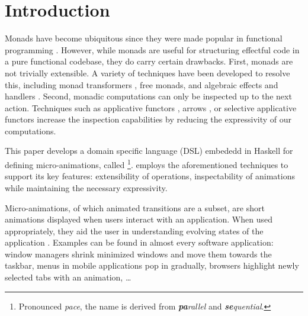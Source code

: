 \section{Introduction}
\label{sec:intro}

Monads have become ubiquitous since they were made popular in functional programming \cite{DBLP:conf/lfp/Wadler90}. However, while monads are useful for structuring effectful code in a pure functional codebase, they do carry certain drawbacks. First, monads are not trivially extensible. A variety of techniques have been developed to resolve this, including monad transformers \cite{DBLP:conf/popl/LiangHJ95}, free monads, and algebraic effects and handlers \cite{DBLP:conf/esop/PlotkinP09}. Second, monadic computations can only be inspected up to the next action. Techniques such as applicative functors \cite{DBLP:journals/jfp/McbrideP08}, arrows \cite{DBLP:journals/scp/Hughes00}, or selective applicative functors increase the inspection capabilities by reducing the expressivity of our computations.

This paper develops a domain specific language (DSL) embededd in Haskell for defining micro-animations, called \dsl{}\footnote{Pronounced \textit{pace}, the name is derived from \textit{\textbf{pa}rallel} and \textit{\textbf{se}quential}.}. \dsl{} employs the aforementioned techniques to support its key features: extensibility of operations, inspectability of animations while maintaining the necessary expressivity.

Micro-animations, of which animated transitions are a subset, are short animations displayed when users interact with an application. When used appropriately, they aid the user in understanding evolving states of the application \cite{DBLP:conf/infovis/BedersonB99} \cite{DBLP:conf/chi/Gonzalez96} \cite{DBLP:journals/tvcg/HeerR07}. Examples can be found in almost every software application: window managers shrink minimized windows and move them towards the taskbar, menus in mobile applications pop in gradually, browsers highlight newly selected tabs with an animation, \ldots

